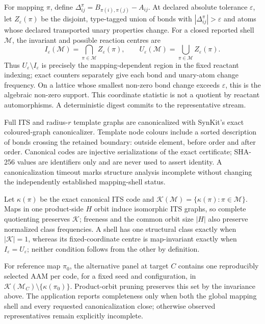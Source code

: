 \documentclass[11pt]{article}
\begin{document}
For mapping $\pi$, define
$\Delta^\pi_{ij}=B_{\pi(i),\pi(j)}-A_{ij}$.  At declared absolute tolerance
$\varepsilon$, let $Z_\varepsilon(\pi)$ be the disjoint, type-tagged union of
bonds with $|\Delta^\pi_{ij}|>\varepsilon$ and atoms whose declared transported
unary properties change.  For a closed reported shell $\mathcal M$, the
invariant and possible reaction centres are
\begin{equation}
 I_\varepsilon(\mathcal M)=\bigcap_{\pi\in\mathcal M}Z_\varepsilon(\pi),\qquad
 U_\varepsilon(\mathcal M)=\bigcup_{\pi\in\mathcal M}Z_\varepsilon(\pi).
 \label{eq:centre-spectrum}
\end{equation}
Thus $U_\varepsilon\setminus I_\varepsilon$ is precisely the
mapping-dependent region in the fixed reactant indexing; exact counters
separately give each bond and unary-atom change frequency.  On a lattice whose
smallest non-zero bond change exceeds $\varepsilon$, this is the algebraic
non-zero support.  This coordinate statistic is not a quotient by reactant
automorphisms.  A deterministic digest commits to the representative stream.

Full ITS and radius-$r$ template graphs are canonicalized with SynKit's exact
coloured-graph canonicalizer.  Template node colours include a sorted
description of bonds crossing the retained boundary: outside element, before
order and after order.  Canonical codes are injective serializations of the
exact certificate; SHA-256 values are identifiers only and are never used to
assert identity.  A canonicalization timeout marks structure analysis
incomplete without changing the independently established mapping-shell
status.

Let $\kappa(\pi)$ be the exact canonical ITS code and
$\mathcal K(\mathcal M)=\{\kappa(\pi):\pi\in\mathcal M\}$.  Maps in one
product-side $H$ orbit induce isomorphic ITS graphs, so complete quotienting
preserves $\mathcal K$; freeness and the common orbit size $|H|$ also preserve
normalized class frequencies.  A shell has one structural class exactly when
$|\mathcal K|=1$, whereas its fixed-coordinate centre is map-invariant exactly
when $I_\varepsilon=U_\varepsilon$; neither condition follows from the other by
definition.

For reference map $\pi_0$, the alternative panel at target $C$ contains one
reproducibly selected AAM per code, for a fixed seed and configuration, in
$\mathcal K(\mathcal M_C)\setminus\{\kappa(\pi_0)\}$.  Product-orbit pruning
preserves this set by the invariance above.  The application reports
completeness only when both the global mapping shell and every requested
canonicalization close; otherwise observed representatives remain explicitly
incomplete.
\end{document}
